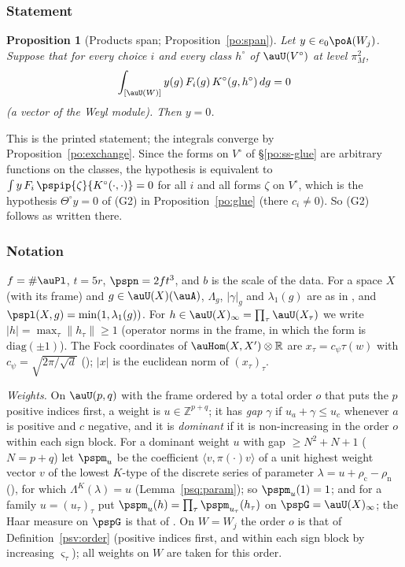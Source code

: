 \documentclass[10pt]{amsart}
\newtheorem{proposition}[theorem]{Proposition}
\theoremstyle{definition}
\theoremstyle{remark}
\newcommand{\R}{\mathbb R}
\newcommand{\Z}{\mathbb Z}
\begin{document}
\subsubsection{Statement}\label{psp:ss-statement}

\begin{proposition}[Products span; Proposition~\ref{po:span}]\label{psp:main}
Let $y\in e_0\poA(W_j)$. Suppose that for every choice $i$ and every class $h^\circ$ of
$\auU(V^\circ)$ at level $\pi_M^2$,
\[
\int_{[\auU(W)]}y(g)\,F_i(g)\,K^\circ(g,h^\circ)\,dg=0
\]
(a vector of the Weyl module). Then $y=0$.
\end{proposition}

This is the printed statement; the integrals converge by Proposition~\ref{po:exchange}. Since the
forms on $V^\circ$ of \S\ref{po:ss-glue} are arbitrary functions on the classes, the hypothesis is
equivalent to $\int y\,F_i\,\pspip{\zeta}{K^\circ(\cdot,\cdot)}=0$ for all $i$ and all forms $\zeta$ on
$V^\circ$, which is the hypothesis $\Theta^\circ y=0$ of (G2) in Proposition~\ref{po:glue} (there
$c_i\ne0$). So (G2) follows as written there.

\subsubsection{Notation}\label{psp:ss-notation}

$f=\#\auPl$, $t=5r$, $\pspn=2ft^3$, and $b$ is the scale of the data. For a space $X$ (with its frame)
and $g\in\auU(X)(\auA)$, $\Lambda_g$, $|\gamma|_g$ and $\lambda_1(g)$ are as in
{\cite[Definition~3.27]{P53}}, and $\pspl(X,g)=\min(1,\lambda_1(g))$. For $h\in\auU(X)_\infty=\prod_\tau
\auU(X_\tau)$ we write $|h|=\max_\tau\|h_\tau\|\ge1$ (operator norms in the frame, in which the form
is $\mathrm{diag}(\pm1)$). The Fock coordinates of $\auHom(X,X')\otimes\R$ are $x_\tau=c_\psi\tau(w)$
with $c_\psi=\sqrt{2\pi/\sqrt d}$ ({\cite[\S5.2.1]{P49}}); $|x|$ is the euclidean norm of
$(x_\tau)_\tau$.

\emph{Weights.} On $\auU(p,q)$ with the frame ordered by a total order $o$ that puts the $p$ positive
indices first, a weight is $u\in\Z^{p+q}$; it has \emph{gap} $\gamma$ if $u_a+\gamma\le u_c$ whenever
$a$ is positive and $c$ negative, and it is \emph{dominant} if it is non-increasing in the order $o$
within each sign block. For a dominant weight $u$ with gap $\ge N^2+N+1$ ($N=p+q$) let $\pspm_u$ be the
coefficient $\langle v,\pi(\cdot)v\rangle$ of a unit highest weight vector $v$ of the lowest $K$-type of the
discrete series of parameter $\lambda=u+\rho_{\mathrm c}-\rho_{\mathrm n}$ ({\cite[\S5.1]{P51}}), for which
$\Lambda^K(\lambda)=u$ (Lemma~\ref{psq:param}); so $\pspm_u(1)=1$; and for a family $u=(u_\tau)_\tau$ put $\pspm_u(h)=\prod_\tau\pspm_{u_\tau}(h_\tau)$
on $\pspG=\auU(X)_\infty$; the Haar measure on $\pspG$ is that of {\cite[\S5.4]{P51}}. On $W=W_j$ the
order $o$ is that of Definition~\ref{psv:order} (positive indices first, and within each sign block by
increasing $\varsigma_\tau$); all weights on $W$ are taken for this order.
\end{document}
